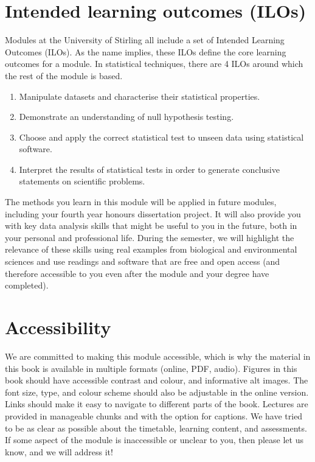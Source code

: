 \documentclass[
]{scrbook}
\providecommand{\tightlist}{%
  \setlength{\itemsep}{0pt}\setlength{\parskip}{0pt}}
\begin{document}
\hypertarget{ILOs}{%
\section*{Intended learning outcomes (ILOs)}\label{ILOs}}

Modules at the University of Stirling all include a set of Intended Learning Outcomes (ILOs).
As the name implies, these ILOs define the core learning outcomes for a module.
In statistical techniques, there are 4 ILOs around which the rest of the module is based.

\begin{enumerate}
\def\labelenumi{\arabic{enumi}.}
\tightlist
\item
  Manipulate datasets and characterise their statistical properties.
\item
  Demonstrate an understanding of null hypothesis testing.
\item
  Choose and apply the correct statistical test to unseen data using statistical software.
\item
  Interpret the results of statistical tests in order to generate conclusive statements on scientific problems.
\end{enumerate}

The methods you learn in this module will be applied in future modules, including your fourth year honours dissertation project.
It will also provide you with key data analysis skills that might be useful to you in the future, both in your personal and professional life.
During the semester, we will highlight the relevance of these skills using real examples from biological and environmental sciences and use readings and software that are free and open access (and therefore accessible to you even after the module and your degree have completed).

\hypertarget{accessibility}{%
\section*{Accessibility}\label{accessibility}}

We are committed to making this module accessible, which is why the material in this book is available in multiple formats (online, PDF, audio).
Figures in this book should have accessible contrast and colour, and informative alt images.
The font size, type, and colour scheme should also be adjustable in the online version.
Links should make it easy to navigate to different parts of the book.
Lectures are provided in manageable chunks and with the option for captions.
We have tried to be as clear as possible about the timetable, learning content, and assessments.
If some aspect of the module is inaccessible or unclear to you, then please let us know, and we will address it!
\end{document}
